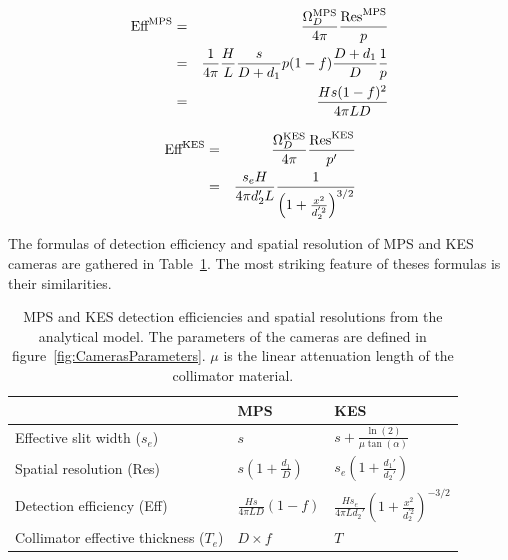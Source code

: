 \documentclass[a4paper,english,12pt]{article}
\begin{document}
\begin{eqnarray}
  \label{eq:de_mps}
  \textrm{Eff}_{}^{\textrm{MPS}} & = & \frac{\Omega_D^{\textrm{MPS}}}{4\pi} \frac{\textrm{Res}_{}^{\textrm{MPS}}}{p} \nonumber\\
                & = & \frac{1}{4\pi} \frac{H}{L} \frac{s}{D+d_1} p(1-f)
                      \frac{D+d_1}{D} \frac{1}{p} \nonumber\\
                & = & \frac{Hs(1-f)^2}{4 \pi L D}
\end{eqnarray}

\begin{eqnarray}
  \label{eq:de_kes}
	\textrm{Eff}_{}^{\textrm{KES}} & = & \frac{\Omega_D^{\textrm{KES}}}{4\pi} \frac{\textrm{Res}_{}^{\textrm{KES}}}{p'} \nonumber\\
	& = & \frac{s_e H}{4\pi d_2' L} \frac{1}{\left( 1+\frac{x^2}{d_2^{'2}}\right)^{3/2}}
\end{eqnarray}



The formulas of detection efficiency and spatial resolution of MPS and KES cameras are gathered in Table~\ref{table:AMformulas}. The most striking feature of theses 
formulas is their similarities. 

\begin{table}[h]
\centering
\begin{tabular}{lll}
	\midrule
	                            & MPS                              & KES \\
	\midrule
	Effective slit width ($s_e$)& $s$                              & $s + \frac{\ln(2)}{\mu \tan(\alpha)}$ \\
 	Spatial resolution (Res)		& $s \left(1+\frac{d_1}{D}\right)$ & $s_e \left( 1+\frac{d_1'}{d_2'} \right)$ \\
	Detection efficiency (Eff)	& $\frac{H s}{ 4 \pi L D } (1-f) $ & $\frac{H s_e}{ 4 \pi L d_2' } \left( 1 + \frac{x^2}{d_2^{'2}} \right)^{-3/2} $ \\
 	Collimator effective thickness ($T_e$) & $D\times f$           & $T$ \\
	\midrule
\end{tabular}
\caption{MPS and KES detection efficiencies and spatial resolutions from the analytical model. The parameters of the cameras are defined in figure~\ref{fig:CamerasParameters}. $\mu$ is the linear attenuation length of the collimator material.}
\label{table:AMformulas}
\end{table}
\end{document}
